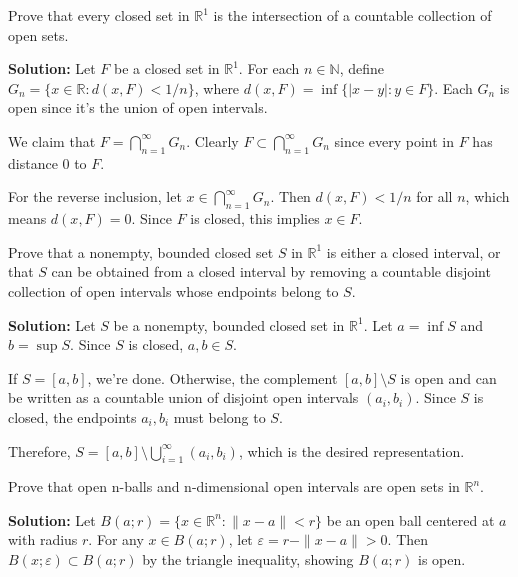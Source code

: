 \begin{problembox}
Prove that every closed set in $\mathbb{R}^1$ is the intersection of a countable collection of open sets.
\end{problembox}

\textbf{Solution:} Let $F$ be a closed set in $\mathbb{R}^1$. For each $n \in \mathbb{N}$, define $G_n = \{x \in \mathbb{R} : d(x,F) < 1/n\}$, where $d(x,F) = \inf\{|x-y| : y \in F\}$. Each $G_n$ is open since it's the union of open intervals.

We claim that $F = \bigcap_{n=1}^{\infty} G_n$. Clearly $F \subset \bigcap_{n=1}^{\infty} G_n$ since every point in $F$ has distance 0 to $F$.

For the reverse inclusion, let $x \in \bigcap_{n=1}^{\infty} G_n$. Then $d(x,F) < 1/n$ for all $n$, which means $d(x,F) = 0$. Since $F$ is closed, this implies $x \in F$.

\begin{problembox}
Prove that a nonempty, bounded closed set $S$ in $\mathbb{R}^1$ is either a closed interval, or that $S$ can be obtained from a closed interval by removing a countable disjoint collection of open intervals whose endpoints belong to $S$.
\end{problembox}

\textbf{Solution:} Let $S$ be a nonempty, bounded closed set in $\mathbb{R}^1$. Let $a = \inf S$ and $b = \sup S$. Since $S$ is closed, $a, b \in S$.

If $S = [a,b]$, we're done. Otherwise, the complement $[a,b] \setminus S$ is open and can be written as a countable union of disjoint open intervals $(a_i, b_i)$. Since $S$ is closed, the endpoints $a_i, b_i$ must belong to $S$.

Therefore, $S = [a,b] \setminus \bigcup_{i=1}^{\infty} (a_i, b_i)$, which is the desired representation.

\begin{problembox}
Prove that open n-balls and n-dimensional open intervals are open sets in $\mathbb{R}^n$.
\end{problembox}

\textbf{Solution:} Let $B(a;r) = \{x \in \mathbb{R}^n : \|x-a\| < r\}$ be an open ball centered at $a$ with radius $r$. For any $x \in B(a;r)$, let $\varepsilon = r - \|x-a\| > 0$. Then $B(x;\varepsilon) \subset B(a;r)$ by the triangle inequality, showing $B(a;r)$ is open.

